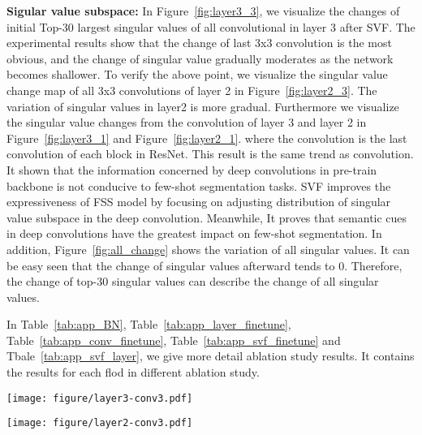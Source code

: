 \documentclass{article}
\begin{document}
\textbf{Sigular value subspace:} In Figure~\ref{fig:layer3_3}, we visualize the changes of initial Top-30 largest singular values of all  convolutional in layer 3 after SVF. The experimental results show that the change of last 3x3 convolution is the most obvious, and the change of singular value gradually moderates as the network becomes shallower. To verify the above point, we visualize the singular value change map of all 3x3 convolutions of layer 2 in Figure~\ref{fig:layer2_3}. The variation of singular values in layer2 is more gradual. Furthermore we visualize the singular value changes from the  convolution of layer 3 and layer 2 in Figure~\ref{fig:layer3_1} and Figure~\ref{fig:layer2_1}. where the  convolution is the last  convolution of each block in ResNet. This result is the same trend as  convolution. It shown that the information concerned by deep convolutions in pre-train backbone is not conducive to few-shot segmentation tasks. SVF improves the expressiveness of FSS model by focusing on adjusting distribution of singular value subspace in the deep convolution. Meanwhile, It proves that semantic cues in deep convolutions have the greatest impact on few-shot segmentation. In addition, Figure~\ref{fig:all_change} shows the variation of all singular values. It can be easy seen that the change of singular values afterward tends to 0. Therefore, the change of top-30 singular values can describe the change of all singular values.

In Table~\ref{tab:app_BN}, Table~\ref{tab:app_layer_finetune}, Table~\ref{tab:app_conv_finetune}, Table~\ref{tab:app_svf_finetune} and Tbale~\ref{tab:app_svf_layer}, we give more detail ablation study results. It contains the results for each flod in different ablation study.

\begin{figure*}
\vspace{-0.7em}
	\centering
	\setlength{\abovecaptionskip}{0.cm}
	\texttt{[image: figure/layer3-conv3.pdf]}
	\vspace{-.4em}
	\caption{Statistics chart about the changes of initial Top-30 largest singular values of the  convolutional in layer3 after SVF. }
	\label{fig:layer3_3}
	
\end{figure*}

\begin{figure*}
	\centering
	\setlength{\abovecaptionskip}{0.cm}
	\texttt{[image: figure/layer2-conv3.pdf]}
	\vspace{-.4em}
	\caption{Statistics chart about the changes of initial Top-30 largest singular values of the  convolutional in layer2 after SVF. }
	\label{fig:layer2_3}
	
\end{figure*}
\end{document}
